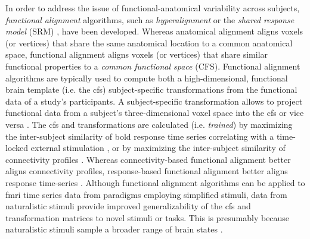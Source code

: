 %
%
In order to address the issue of functional-anatomical variability across
subjects, \textit{functional alignment} algorithms, such as
\textit{hyperalignment} \citep{haxby2011common, guntupalli2016model} or the
\textit{shared response model} (SRM) \citep{chen2015reduced,
zhang2016searchlight}, have been developed.
%
Whereas anatomical alignment aligns voxels (or vertices) that share the same
anatomical location to a common anatomical space, functional alignment aligns
voxels (or vertices) that share similar functional properties to a
\textit{common functional space} (CFS).
%
Functional alignment algorithms are typically used to compute both a
high-dimensional, functional brain template (i.e. the \ac{cfs}) subject-specific
transformations from the functional data of a study's participants.
%
A subject-specific transformation allows to project functional data from a
subject's three-dimensional voxel space into the \ac{cfs} or vice versa
\citep{haxby2020hyperalignment, kumar2020brainiak}.
%
The \ac{cfs} and transformations are calculated (i.e. \textit{trained}) by
maximizing the inter-subject similarity of \ac{bold} response time series
correlating with a time-locked external stimulation \citep{haxby2011common,
chen2015reduced, sabuncu2010function}, or by maximizing the inter-subject
similarity of connectivity profiles \citep{feilong2018reliable,
guntupalli2018computational, nastase2019leveraging}.
%
Whereas connectivity-based functional alignment better aligns connectivity
profiles, response-based functional alignment better aligns response time-series
\citep{guntupalli2018computational}.
%
Although functional alignment algorithms can be applied to \ac{fmri} time series
data from paradigms employing simplified stimuli, data from naturalistic stimuli
provide
%
improved generalizability of the \ac{cfs}
%
and transformation matrices
%
to novel stimuli or tasks.
%
This is presumably because naturalistic stimuli sample a broader range of brain
states \citep{haxby2011common, guntupalli2016model}.

